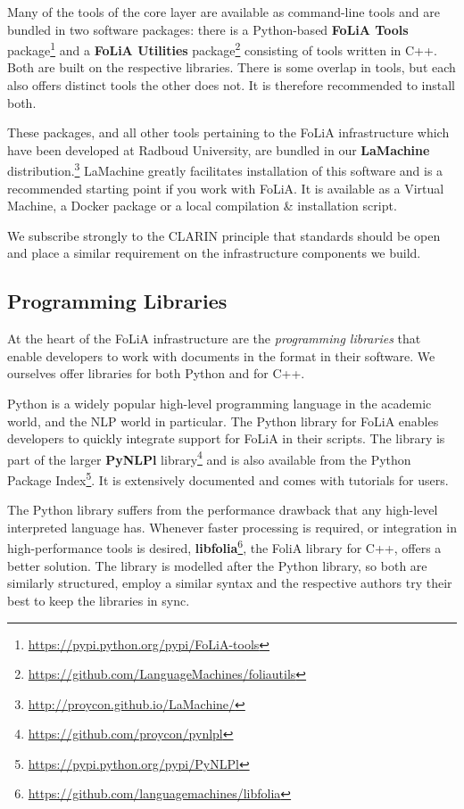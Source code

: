 \documentclass[a4paper,11pt]{article}
\begin{document}
Many of the tools of the core layer are available as command-line tools and are
bundled in two software packages: there is a Python-based \textbf{FoLiA Tools}
package\footnote{\url{https://pypi.python.org/pypi/FoLiA-tools}} and a \textbf{FoLiA
Utilities} package\footnote{\url{https://github.com/LanguageMachines/foliautils}}
consisting of tools written in C++. Both are built on the respective libraries.
There is some overlap in tools, but each also offers distinct tools the other
does not. It is therefore recommended to install both.

These packages, and all other tools pertaining to the FoLiA infrastructure
which have been developed at Radboud University, are bundled in our
\textbf{LaMachine}
distribution.\footnote{\url{http://proycon.github.io/LaMachine/}} LaMachine
greatly facilitates installation of this software and is a recommended starting
point if you work with FoLiA. It is available as a Virtual Machine, a Docker
package or a local compilation \& installation script.

We subscribe strongly to the CLARIN principle that standards should be open and
place a similar requirement on the infrastructure components we build. 

\subsection{Programming Libraries}

At the heart of the FoLiA infrastructure are the \emph{programming libraries} that
enable developers to work with documents in the format in their software. We
ourselves offer libraries for both Python and for C++.

Python is a widely popular high-level programming language in the academic
world, and the NLP world in particular.  The Python library for FoLiA enables
developers to quickly integrate support for FoLiA in their scripts. The library
is part of the larger \textbf{PyNLPl}
library\footnote{\url{https://github.com/proycon/pynlpl}} and is also available from the
Python Package Index\footnote{\url{https://pypi.python.org/pypi/PyNLPl}}. It is extensively documented and comes with tutorials for
users.

The Python library suffers from the performance drawback that any high-level
interpreted language has. Whenever faster processing is required, or
integration in high-performance tools is desired,
\textbf{libfolia}\footnote{\url{https://github.com/languagemachines/libfolia}}, the
FoliA library for C++, offers a better solution. The library is modelled after
the Python library, so both are similarly structured, employ a similar syntax
and the respective authors try their best to keep the libraries in sync.
\end{document}
